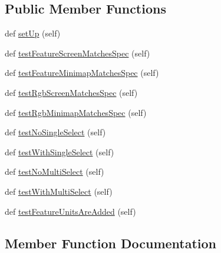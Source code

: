 \subsection*{Public Member Functions}
\begin{DoxyCompactItemize}
\item 
def \mbox{\hyperlink{classpysc2_1_1tests_1_1dummy__observation__test_1_1_dummy_observation_test_a90c890d9d56733790183fe8dcc53a916}{set\+Up}} (self)
\item 
def \mbox{\hyperlink{classpysc2_1_1tests_1_1dummy__observation__test_1_1_dummy_observation_test_affe2dfa9a11280cca802b80ba8a869a0}{test\+Feature\+Screen\+Matches\+Spec}} (self)
\item 
def \mbox{\hyperlink{classpysc2_1_1tests_1_1dummy__observation__test_1_1_dummy_observation_test_a5c5ac3c3392eaad94fe6471e7cc9def0}{test\+Feature\+Minimap\+Matches\+Spec}} (self)
\item 
def \mbox{\hyperlink{classpysc2_1_1tests_1_1dummy__observation__test_1_1_dummy_observation_test_aad2ea391040824fc0fafce2e1977edec}{test\+Rgb\+Screen\+Matches\+Spec}} (self)
\item 
def \mbox{\hyperlink{classpysc2_1_1tests_1_1dummy__observation__test_1_1_dummy_observation_test_a1c3bb18eb8dafe864dff78378087640f}{test\+Rgb\+Minimap\+Matches\+Spec}} (self)
\item 
def \mbox{\hyperlink{classpysc2_1_1tests_1_1dummy__observation__test_1_1_dummy_observation_test_ace9d92fbc949b4d83b9bb2a1e30e296b}{test\+No\+Single\+Select}} (self)
\item 
def \mbox{\hyperlink{classpysc2_1_1tests_1_1dummy__observation__test_1_1_dummy_observation_test_a5c63e3a39253ff187c1287501a5e6aeb}{test\+With\+Single\+Select}} (self)
\item 
def \mbox{\hyperlink{classpysc2_1_1tests_1_1dummy__observation__test_1_1_dummy_observation_test_aa0a667046ce3bb0b9275d1a989a63034}{test\+No\+Multi\+Select}} (self)
\item 
def \mbox{\hyperlink{classpysc2_1_1tests_1_1dummy__observation__test_1_1_dummy_observation_test_af4726de0b495c433f04588fba6aa469d}{test\+With\+Multi\+Select}} (self)
\item 
def \mbox{\hyperlink{classpysc2_1_1tests_1_1dummy__observation__test_1_1_dummy_observation_test_a8109cde8b155117150fce42a1519f5d2}{test\+Feature\+Units\+Are\+Added}} (self)
\end{DoxyCompactItemize}


\subsection{Member Function Documentation}
\mbox{\label{classpysc2_1_1tests_1_1dummy__observation__test_1_1_dummy_observation_test_a90c890d9d56733790183fe8dcc53a916}} 
